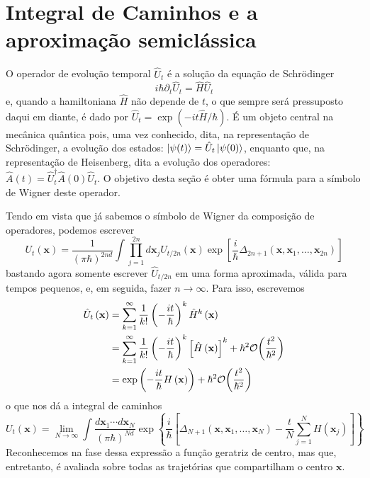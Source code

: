 \documentclass[
	12pt,
	oneside,			%
	a4paper,			%
	english,			%
	brazil				%
	]{abntex2}
\theoremstyle{definition}
\begin{document}
\section{Integral de Caminhos e a aproximação semiclássica}
O operador de evolução temporal $\hat{U}_t$ é a solução da equação de Schrödinger
\begin{equation}
    i \hbar \partial_t \hat{U}_t = \hat{H} \hat{U}_t
\end{equation}
e, quando a hamiltoniana $\hat{H}$ não depende de $t$, o que sempre será pressuposto daqui em diante, é dado por $\hat{U}_t = \exp \left( - i t\hat{H}/\hbar\right)$. É um objeto central na mecânica quântica pois, uma vez conhecido, dita, na representação de Schrödinger, a evolução dos estados: $\ket{\psi(t)} = \hat{U}_t \ket{\psi(0)}$, enquanto que, na representação de Heisenberg, dita a evolução dos operadores: $\hat{A}(t) = \hat{U}^\dagger_t \hat{A}(0) \hat{U}_t$. O objetivo desta seção é obter uma fórmula para a símbolo de Wigner deste operador.

Tendo em vista que já sabemos o símbolo de Wigner da composição de operadores, podemos escrever
\begin{equation}
    U_t \left( \mathbf{x} \right) =  \frac{1}{\left( \pi \hbar \right)^{2nd}}\int \prod_{j=1}^{2n} d \mathbf{x}_j U_{t/2n} \left( \mathbf{x} \right) \exp \left[ \frac{i}{\hbar} \Delta_{2n+1} \left( \mathbf{x},\mathbf{x}_1,\ldots,\mathbf{x}_{2n} \right) \right]
\end{equation}
bastando agora somente escrever $\hat{U}_{t/2n}$ em uma forma aproximada, válida para tempos pequenos, e, em seguida, fazer $n \to \infty$. Para isso, escrevemos
\begin{equation}
\label{sem ideiaas}
    \begin{aligned}
        \hat{U}_t\left( \mathbf{x} \right) &= \sum_{k=1}^{\infty} \frac{1}{k!} \left( -\frac{it}{\hbar} \right)^k \hat{H}^k \left( \mathbf{x} \right) \\ &= \sum_{k=1}^{\infty} \frac{1}{k!} \left( -\frac{it}{\hbar} \right)^k \left[\hat{H} \left( \mathbf{x} \right) \right]^k+\hbar^2 \order{\frac{t^2}{\hbar^2}} \\
        &= \exp\left( -\frac{it}{\hbar} H\left(\mathbf{x}\right) \right) +  \hbar^2 \order{\frac{t^2}{\hbar^2}}
    \end{aligned}
\end{equation}
o que nos dá a integral de caminhos
\begin{equation}
\label{integral de caminhos}
    U_t\left(\mathbf{x} \right) = \lim_{N\to \infty} \int\frac{d\mathbf{x}_1 \cdots d \mathbf{x}_N}{\left( \pi \hbar \right)^{Nd}}  \exp \left\{ \frac{i}{\hbar}\left[ \Delta_{N+1} \left( \mathbf{x},\mathbf{x}_1,\ldots,\mathbf{x}_N \right)-\frac{t}{N}\sum_{j=1}^N H\left(\mathbf{x}_j\right)\right] \right\}
\end{equation}
Reconhecemos na fase dessa expressão a função geratriz de centro, mas que, entretanto, é avaliada sobre todas as trajetórias que compartilham o centro $\mathbf{x}$.
\end{document}
